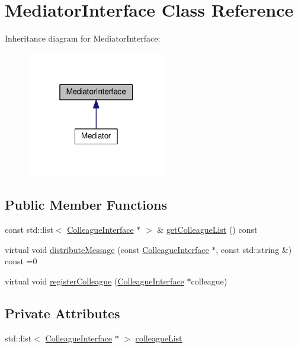 \hypertarget{classMediatorInterface}{}\section{Mediator\+Interface Class Reference}
\label{classMediatorInterface}


Inheritance diagram for Mediator\+Interface\+:
\nopagebreak
\begin{figure}[H]
\begin{center}
\leavevmode
\includegraphics[width=172pt]{classMediatorInterface__inherit__graph}
\end{center}
\end{figure}
\subsection*{Public Member Functions}
\begin{DoxyCompactItemize}
\item 
const std\+::list$<$ \hyperlink{classColleagueInterface}{Colleague\+Interface} $\ast$ $>$ \& \hyperlink{classMediatorInterface_ac7329ec51656cb23b2c41ada567570fc}{get\+Colleague\+List} () const 
\item 
virtual void \hyperlink{classMediatorInterface_a6445b79436acab5998b8a957648fadb1}{distribute\+Message} (const \hyperlink{classColleagueInterface}{Colleague\+Interface} $\ast$, const std\+::string \&) const =0
\item 
virtual void \hyperlink{classMediatorInterface_acf4de17fcada54c6701c2afb11c754bd}{register\+Colleague} (\hyperlink{classColleagueInterface}{Colleague\+Interface} $\ast$colleague)
\end{DoxyCompactItemize}
\subsection*{Private Attributes}
\begin{DoxyCompactItemize}
\item 
std\+::list$<$ \hyperlink{classColleagueInterface}{Colleague\+Interface} $\ast$ $>$ \hyperlink{classMediatorInterface_a6bb9dcea81ba62644bcaec1bf590cb42}{colleague\+List}
\end{DoxyCompactItemize}


